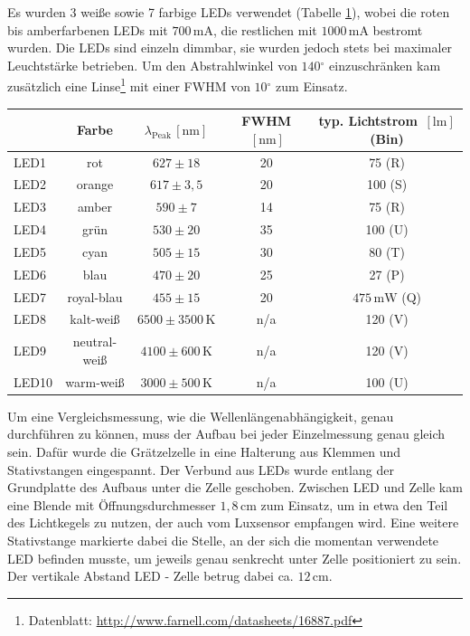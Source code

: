 \documentclass[11pt]{scrartcl}
\newcommand{\unit}[1]{\ensuremath{\,\mathrm{#1}}} %
\newcommand{\degr}{\ensuremath{^\circ}}
\begin{document}
Es wurden 3 weiße sowie 7 farbige LEDs verwendet (Tabelle \ref{leds}), wobei die roten bis amberfarbenen LEDs mit $700 \unit{mA}$, die restlichen mit $1000 \unit{mA}$ bestromt wurden. Die LEDs sind einzeln dimmbar, sie wurden jedoch stets bei maximaler Leuchtst\"arke betrieben. Um den Abstrahlwinkel von $140\degr$ einzuschränken kam zusätzlich eine Linse\footnote{Datenblatt: \url{http://www.farnell.com/datasheets/16887.pdf}} mit einer FWHM von $10\degr$ zum Einsatz.

\begin{table}[ht]
\label{leds}
\begin{center}\vspace{-\baselineskip}
\begin{tabular}{l|cccc}
&Farbe &
$\lambda_{\text{Peak}} \unit{[nm]}$ &
FWHM $\unit{[nm]}$ &
typ. Lichtstrom $\unit{[lm]}$ (Bin)\\
\hline
LED1 & rot		& $627 \pm 18$		& 20	& 75 (R)	\\
LED2 & orange		& $617 \pm 3,5$		& 20	& 100 (S)	\\
LED3 & amber		& $590 \pm 7$		& 14	& 75 (R)	\\
LED4 & grün		& $530 \pm 20$		& 35	& 100 (U)	\\
LED5 & cyan		& $505 \pm 15$		& 30	& 80 (T)	\\
LED6 & blau		& $470 \pm 20$		& 25	& 27 (P)	\\
LED7 & royal-blau	& $455 \pm 15$		& 20	& $475 \unit{mW}$ (Q)\\
LED8 & kalt-weiß	& $6500\pm 3500\unit{K}$& n/a	& 120 (V)	\\
LED9 & neutral-weiß	& $4100\pm 600 \unit{K}$& n/a	& 120 (V)	\\
LED10 & warm-weiß	& $3000\pm 500 \unit{K}$& n/a	& 100 (U)	
\end{tabular}
\vspace{-\baselineskip}\end{center}
\end{table}


Um eine Vergleichsmessung, wie die Wellenl\"angenabh\"angigkeit, genau durchf\"uhren zu k\"onnen, muss der Aufbau bei jeder Einzelmessung genau gleich sein. Daf\"ur wurde die Gr\"atzelzelle in eine Halterung aus Klemmen und Stativstangen eingespannt. Der Verbund aus LEDs wurde entlang der Grundplatte des Aufbaus unter die Zelle geschoben. Zwischen LED und Zelle kam eine Blende mit \"Offnungsdurchmesser $1,8\unit{cm}$ zum Einsatz, um in etwa den Teil des Lichtkegels zu nutzen, der auch vom Luxsensor empfangen wird. Eine weitere Stativstange markierte dabei die Stelle, an der sich die momentan verwendete LED befinden musste, um jeweils genau senkrecht unter Zelle positioniert zu sein. Der vertikale Abstand LED - Zelle betrug dabei ca. $12\unit{cm}$.
\end{document}
